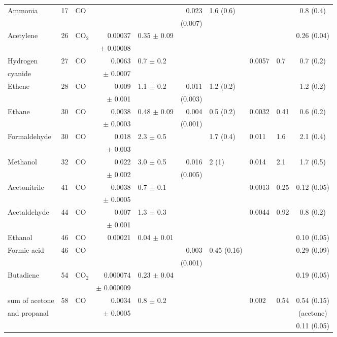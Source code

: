 \documentclass[acp, manuscript]{copernicus}
\begin{document}
\begin{supertabular}{l l l r l r l l l c}
    Ammonia & 17 &  CO & & & 0.023  & 1.6 (0.6) & & & 0.8 (0.4) \\
     &  & & & & (0.007)& & & & \\
  Acetylene & 26  & CO$_2$ & 0.00037  & 0.35 $\pm$ 0.09 & & & & & 0.26 (0.04) \\ 
  &&&$\pm$ 0.00008&&&&&&\\
  Hydrogen  & 27 & CO & 0.0063  & 0.7 $\pm$ 0.2 & & & 0.0057 & 0.7 & 0.7 (0.2) \\ 
  cyanide&&&$\pm$ 0.0007&&&&&&\\
  Ethene & 28 &  CO & 0.009 & 1.1 $\pm$ 0.2& 0.011  & 1.2 (0.2) & & & 1.2 (0.2) \\ 
  &&&$\pm$ 0.001&&(0.003)&&&&\\
  Ethane & 30  & CO & 0.0038 & 0.48 $\pm$ 0.09 & 0.004  & 0.5 (0.2) & 0.0032& 0.41 & 0.6 (0.2) \\
  &&&$\pm$ 0.0003&&(0.001)&&&&\\
  Formaldehyde & 30  & CO & 0.018 & 2.3 $\pm$ 0.5 &  & 1.7 (0.4) & 0.011 & 1.6 & 2.1 (0.4) \\
  &&&$\pm$ 0.003&&&&&&\\
  Methanol & 32  & CO & 0.022 & 3.0 $\pm$ 0.5 & 0.016  & 2 (1) & 0.014 & 2.1 & 1.7 (0.5) \\ 
  &&&$\pm$ 0.002&&(0.005)&&&&\\
  Acetonitrile & 41  & CO & 0.0038 & 0.7 $\pm$ 0.1 & & & 0.0013 & 0.25 & 0.12 (0.05) \\ 
  &&&$\pm$ 0.0005&&&&&&\\
  Acetaldehyde & 44  & CO & 0.007 & 1.3 $\pm$ 0.3& & &0.0044 &0.92 & 0.8 (0.2) \\
  &&&$\pm$ 0.001&&&&&&\\
  Ethanol & 46 & CO & 0.00021& 0.04 $\pm$ 0.01 & & & & & 0.10 (0.05) \\
  Formic acid & 46  &CO & && 0.003 & 0.45 (0.16) & & & 0.29 (0.09) \\ 
  &&&&&(0.001)&&&&\\
  Butadiene &54 & CO$_2$ & 0.000074 & 0.23 $\pm$ 0.04& & & & & 0.19 (0.05) \\ 
  &&&$\pm$ 0.000009&&&&&&\\
  sum of acetone  & 58 & CO & 0.0034 & 0.8 $\pm$ 0.2 & & & 0.002 &0.54 & 0.54 (0.15)  \\
  and propanal &&&$\pm$ 0.0005&&&&&& (acetone) \\
  & &  & & & & & & & 0.11 (0.05) \\

\end{supertabular}
\end{document}
